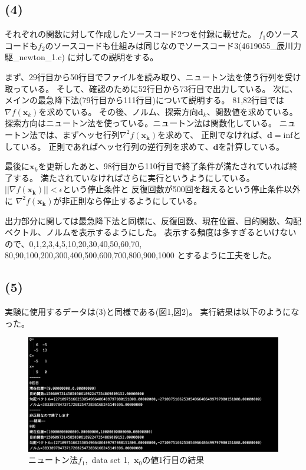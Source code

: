 \documentclass[12pt]{jarticle}
\begin{document}
\clearpage
\subsection*{(4)}
それぞれの関数に対して作成したソースコード2つを付録に載せた。
$f_1$のソースコードも$f_2$のソースコードも仕組みは同じなのでソースコード3(4619055\_辰川力駆\_newton\_1.c)
に対しての説明をする。

まず、29行目から50行目でファイルを読み取り、ニュートン法を使う行列を受け取っている。
そして、確認のために52行目から73行目で出力している。
次に、メインの最急降下法(79行目から111行目)について説明する。
81,82行目では$\nabla f(\boldsymbol{x}_k)$を求めている。
その後、ノルム、探索方向$\boldsymbol{d}_k$、関数値を求めている。
探索方向はニュートン法を使っている。ニュートン法は関数化している。
ニュートン法では、まずヘッセ行列$\nabla^2 f(\boldsymbol{x_k})$を求めて、
正則でなければ、$\boldsymbol{d}=\text{inf}$としている。
正則であればヘッセ行列の逆行列を求めて、$\boldsymbol{d}$を計算している。

最後に$\boldsymbol{x}_k$を更新したあと、98行目から110行目で終了条件が満たされていれば終了する。
満たされていなければさらに実行というようにしている。
$||\nabla f(\boldsymbol{x_k})||<\epsilon$という停止条件と
反復回数が500回を超えるという停止条件以外に
$\nabla^2 f(\boldsymbol{x_k})$が非正則なら停止するようにしている。

出力部分に関しては最急降下法と同様に、反復回数、現在位置、目的関数、勾配ベクトル、ノルムを表示するようにした。
表示する頻度は多すぎるといけないので、0,1,2,3,4,5,10,20,30,40,50,60,70,
80,90,100,200,300,400,500,600,700,800,900,1000
とするように工夫をした。

\subsection*{(5)}
実験に使用するデータは(3)と同様である(図1,図2)。
実行結果は以下のようになった。

\begin{figure}[h]
    \begin{center}
        \includegraphics[scale=0.3]{kadai1_1n_out1_1_1.png}
    \end{center}
    \caption{ニュートン法$f_1$,\ data set 1,\ $\boldsymbol{x}_0$の値1行目の結果}
\end{figure}
\end{document}
